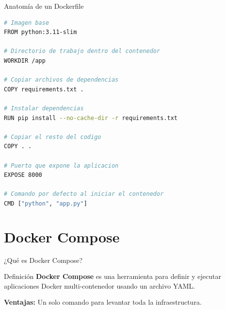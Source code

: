 \documentclass[aspectratio=169]{beamer}
\begin{document}
\begin{frame}[fragile]{Anatomía de un Dockerfile}
\begin{lstlisting}[language=bash, title=Dockerfile]
# Imagen base
FROM python:3.11-slim

# Directorio de trabajo dentro del contenedor
WORKDIR /app

# Copiar archivos de dependencias
COPY requirements.txt .

# Instalar dependencias
RUN pip install --no-cache-dir -r requirements.txt

# Copiar el resto del codigo
COPY . .

# Puerto que expone la aplicacion
EXPOSE 8000

# Comando por defecto al iniciar el contenedor
CMD ["python", "app.py"]
\end{lstlisting}
\end{frame}


\section{Docker Compose}

\begin{frame}{¿Qué es Docker Compose?}
    \begin{block}{Definición}
        \textbf{Docker Compose} es una herramienta para definir y ejecutar aplicaciones Docker multi-contenedor usando un archivo YAML.
    \end{block}
    
    \vspace{0.3cm}
    \centering
    
    \vspace{0.3cm}
    \textbf{Ventajas:} Un solo comando para levantar toda la infraestructura.
\end{frame}
\end{document}
